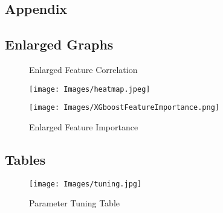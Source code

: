 \documentclass[twocolumn]{article}
\begin{document}

\begin{titlepage}
\section{Appendix}
\subsection{Enlarged Graphs}
\label{sec:pseudo}
\begin{center}
\begin{figure}[h!]
\caption{Enlarged Feature Correlation}
\texttt{[image: Images/heatmap.jpeg]}
\centering
\caption{Enlarged Feature Importance}
\texttt{[image: Images/XGboostFeatureImportance.png]}

\end{figure}

\end{center}

\subsection{Tables}
\begin{figure}[h!]
\centering
\caption{Parameter Tuning Table}
\texttt{[image: Images/tuning.jpg]}
\end{figure}

\end{titlepage}
\end{document}
